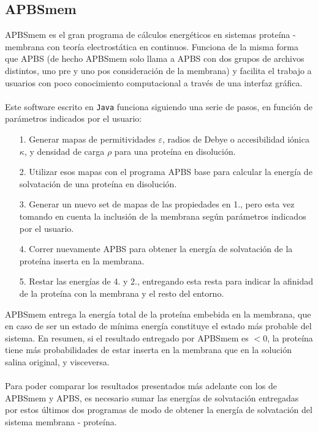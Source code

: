 \documentclass[12pt, oneside, numbers, spanish]{ezthesis}
\numberwithin{equation}{section}
\begin{document}
\subsection{APBSmem}
APBSmem es el gran programa de cálculos energéticos en sistemas proteína - membrana con teoría electrostática en continuos. Funciona de la misma forma que APBS (de hecho APBSmem solo llama a APBS con dos grupos de archivos distintos, uno pre y uno pos consideración de la membrana) y facilita el trabajo a usuarios con poco conocimiento computacional a través de una interfaz gráfica.\\\\
Este software escrito en \texttt{Java} funciona siguiendo una serie de pasos, en función de parámetros indicados por el usuario:
\begin{itemize}
	\item[1.] Generar mapas de permitividades $\varepsilon$, radios de Debye o accesibilidad iónica $\kappa$, y densidad de carga $\rho$ para una proteína en disolución.
	\item[2.] Utilizar esos mapas con el programa APBS base para calcular la energía de solvatación de una proteína en disolución.
	\item[3.] Generar un nuevo set de mapas de las propiedades en 1., pero esta vez tomando en cuenta la inclusión de la membrana según parámetros indicados por el usuario.
	\item[4.] Correr nuevamente APBS para obtener la energía de solvatación de la proteína inserta en la membrana.
	\item[5.] Restar las energías de 4. y 2., entregando esta resta para indicar la afinidad de la proteína con la membrana y el resto del entorno.
\end{itemize}
APBSmem entrega la energía total de la proteína embebida en la membrana, que en caso de ser un estado de mínima energía constituye el estado más probable del sistema. En resumen, si el resultado entregado por APBSmem es $<0$, la proteína tiene más probabilidades de estar inserta en la membrana que en la solución salina original, y visceversa.\\\\
Para poder comparar los resultados presentados más adelante con los de APBSmem y APBS, es necesario sumar las energías de solvatación entregadas por estos últimos dos programas de modo de obtener la energía de solvatación del sistema membrana - proteína.
\end{document}

